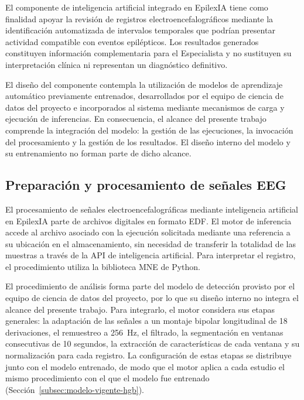 El componente de inteligencia artificial integrado en
EpilexIA tiene como finalidad apoyar la revisión de
registros electroencefalográficos mediante la
identificación automatizada de intervalos temporales
que podrían presentar actividad compatible con
eventos epilépticos. Los resultados generados
constituyen información complementaria para el
Especialista y no sustituyen su interpretación
clínica ni representan un diagnóstico definitivo.

El diseño del componente contempla la utilización de modelos de aprendizaje automático previamente entrenados, desarrollados por el equipo de ciencia de datos del proyecto e incorporados al sistema mediante mecanismos de carga y ejecución de inferencias.
En consecuencia, el alcance del presente trabajo comprende la integración del modelo: la gestión de las ejecuciones, la invocación del procesamiento y la gestión de los resultados.
El diseño interno del modelo y su entrenamiento no forman parte de dicho alcance.

\subsection{Preparación y procesamiento de señales EEG}
\label{subsec:preparacion-procesamiento-eeg-ia}

El procesamiento de señales electroencefalográficas mediante inteligencia artificial en EpilexIA parte de archivos digitales en formato EDF. El motor de inferencia accede al archivo asociado con la ejecución solicitada mediante una referencia a su ubicación en el almacenamiento, sin necesidad de transferir la totalidad de las muestras a través de la API de inteligencia artificial. Para interpretar el registro, el procedimiento utiliza la biblioteca MNE de Python.

El procedimiento de análisis forma parte del modelo de detección provisto por el equipo de ciencia de datos del proyecto, por lo que su diseño interno no integra el alcance del presente trabajo.
Para integrarlo, el motor considera sus etapas generales: la adaptación de las señales a un montaje bipolar longitudinal de 18 derivaciones, el remuestreo a 256~Hz, el filtrado, la segmentación en ventanas consecutivas de 10 segundos, la extracción de características de cada ventana y su normalización para cada registro.
La configuración de estas etapas se distribuye junto con el modelo entrenado, de modo que el motor aplica a cada estudio el mismo procedimiento con el que el modelo fue entrenado (Sección~\ref{subsec:modelo-vigente-hgb}).

